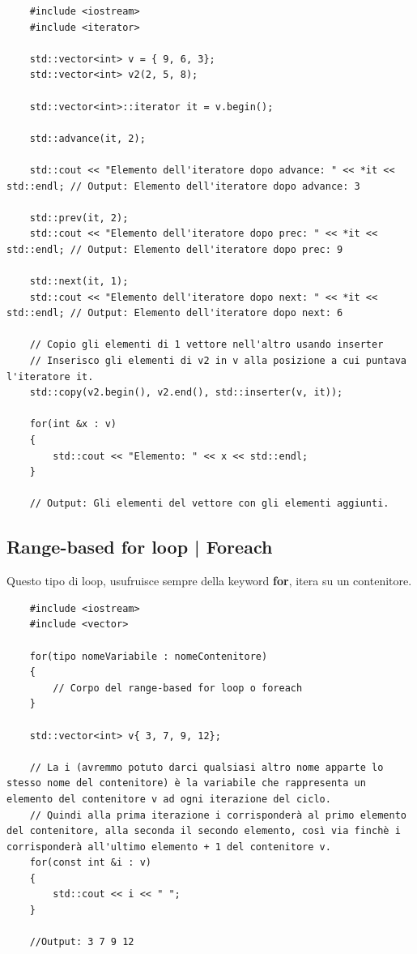 \begin{lstlisting}
	#include <iostream>
	#include <iterator>
	
	std::vector<int> v = { 9, 6, 3};
	std::vector<int> v2(2, 5, 8);
	
	std::vector<int>::iterator it = v.begin();
	
	std::advance(it, 2);
	
	std::cout << "Elemento dell'iteratore dopo advance: " << *it << std::endl; // Output: Elemento dell'iteratore dopo advance: 3
	
	std::prev(it, 2);
	std::cout << "Elemento dell'iteratore dopo prec: " << *it << std::endl; // Output: Elemento dell'iteratore dopo prec: 9
	
	std::next(it, 1);
	std::cout << "Elemento dell'iteratore dopo next: " << *it << std::endl; // Output: Elemento dell'iteratore dopo next: 6
	
	// Copio gli elementi di 1 vettore nell'altro usando inserter
	// Inserisco gli elementi di v2 in v alla posizione a cui puntava l'iteratore it.
	std::copy(v2.begin(), v2.end(), std::inserter(v, it));
	
	for(int &x : v)
	{
		std::cout << "Elemento: " << x << std::endl;
	}

	// Output: Gli elementi del vettore con gli elementi aggiunti.
\end{lstlisting}

\subsection{Range-based for loop | Foreach}

\label{foreach}

\textsf{\small Questo tipo di loop, usufruisce sempre della keyword \textbf{for}, itera su un contenitore.} \\

\begin{lstlisting}
	#include <iostream>
	#include <vector>
	
	for(tipo nomeVariabile : nomeContenitore)
	{
		// Corpo del range-based for loop o foreach
	}

	std::vector<int> v{ 3, 7, 9, 12};
	
	// La i (avremmo potuto darci qualsiasi altro nome apparte lo stesso nome del contenitore) è la variabile che rappresenta un elemento del contenitore v ad ogni iterazione del ciclo.
	// Quindi alla prima iterazione i corrisponderà al primo elemento del contenitore, alla seconda il secondo elemento, così via finchè i corrisponderà all'ultimo elemento + 1 del contenitore v.
	for(const int &i : v)
	{
		std::cout << i << " ";
	}

	//Output: 3 7 9 12
\end{lstlisting}

